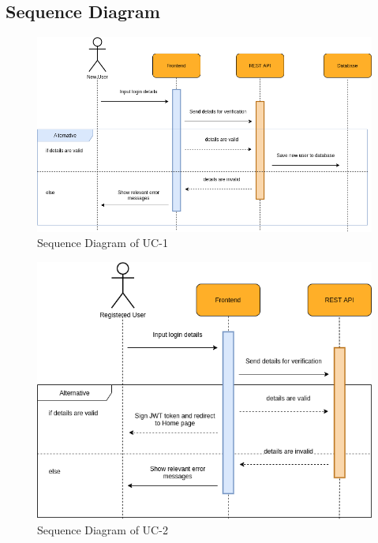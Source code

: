 \subsection{Sequence Diagram}

\begin{figure}[H]
    \centering
    \includegraphics[scale=0.5]{./diagrams/sequence/seq-01.png}
    \caption{Sequence Diagram of UC-1}
    \label{fig:seq-01}
    
\end{figure}


\begin{figure}[H]
    \centering
    \includegraphics[scale=0.5]{./diagrams/sequence/seq-02.png}
    \caption{Sequence Diagram of UC-2}
    \label{fig:seq-02}
    
\end{figure}


